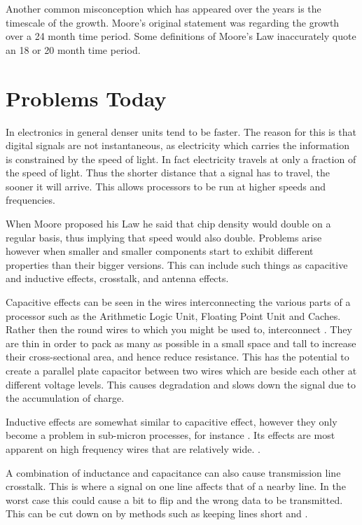 \documentclass[a4paper,12pt]{article}
\begin{document}
Another common misconception which has appeared over the years is the
timescale of the growth. Moore's original statement was regarding the
growth over a 24 month time period. Some definitions of Moore's Law
inaccurately quote an 18 or 20 month time period.

\section{Problems Today}

In electronics in general denser units tend to be faster. The reason for
this
is that digital signals are not instantaneous, as electricity which
carries the
information is constrained by the speed of light. In fact electricity
travels
at only a fraction of the speed of light. Thus the shorter distance that
a
signal has to travel, the sooner it will arrive. This allows processors
to be
run at higher speeds and frequencies.

When Moore proposed his Law he said that chip density would double on a
regular
basis, thus implying that speed would also double. Problems arise
however when
smaller and smaller components start to exhibit different properties
than their
bigger versions. This can include such things as capacitive and
inductive effects, 
crosstalk, and antenna effects.

Capacitive effects can be seen in the wires interconnecting the various
parts
of a processor such as the Arithmetic Logic Unit, Floating Point Unit
and
Caches. Rather then the round wires to which you might be used to,
interconnect
\cite[wires are tall and thin]{b1}. They are thin in order to pack as many as
possible
in a small space and tall to increase their cross-sectional area, and
hence
reduce resistance. This has the potential to create a parallel plate
capacitor
between two wires which are beside each other at different voltage
levels.
This causes degradation and slows down the signal due to the
accumulation of
charge.

Inductive effects are somewhat similar to capacitive effect, however
they only
become a problem in sub-micron processes, for instance \cite[0.25 microns at
gigahertz frequencies]{b2}. Its effects are most apparent on high
frequency
wires that are relatively wide. \cite[One calculation puts the potential
impact to
delay time at 32\%]{b3}. 

A combination of inductance and capacitance can also cause transmission
line
crosstalk. This is where a signal on one line affects that of a nearby
line. In
the worst case this could cause a bit to flip and the wrong data to be
transmitted. This can be cut down on by methods such as keeping lines
short and
\cite[separating strong and weak signal lines]{b4}.
\end{document}

